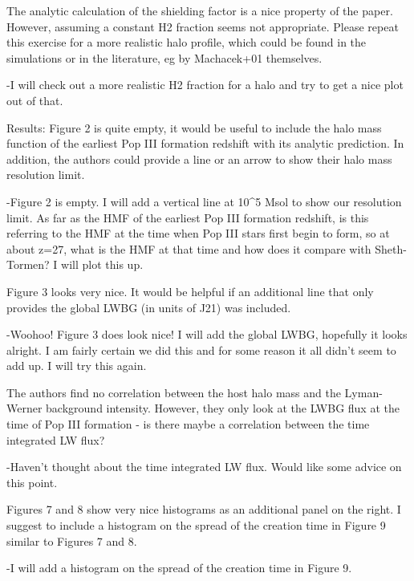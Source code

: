 \documentclass[11pt]{article}
\begin{document}
\begin{referee}
The analytic calculation of the shielding factor is a nice property of the paper. However, assuming a constant H2 fraction seems not appropriate. Please repeat this exercise for a more realistic halo profile, which could be found in the simulations or in the literature, eg by Machacek+01 themselves.
\end{referee}
-I will check out a more realistic H2 fraction for a halo and try to get a nice plot out of that.

\begin{referee}
Results:
Figure 2 is quite empty, it would be useful to include the halo mass function of the earliest Pop III formation redshift with its analytic prediction. In addition, the authors could provide a line or an arrow to show their halo mass resolution limit.
\end{referee}
-Figure 2 is empty. I will add a vertical line at 10^5 Msol to show our resolution limit. As far as the HMF of the earliest Pop III formation redshift, is this referring to the HMF at the time when Pop III stars first begin to form, so at about z=27, what is the HMF at that time and how does it compare with Sheth-Tormen? I will plot this up.

\begin{referee}
Figure 3 looks very nice. It would be helpful if an additional line that only provides the global LWBG (in units of J21) was included.
\end{referee}
-Woohoo! Figure 3 does look nice! I will add the global LWBG, hopefully it looks alright. I am fairly certain we did this and for some reason it all didn't seem to add up. I will try this again.

\begin{referee}
The authors find no correlation between the host halo mass and the Lyman-Werner background intensity. However, they only look at the LWBG flux at the time of Pop III formation - is there maybe a correlation between the time integrated LW flux?
\end{referee}
-Haven't thought about the time integrated LW flux. Would like some advice on this point. 

\begin{referee}
Figures 7 and 8 show very nice histograms as an additional panel on the right. I suggest to include a histogram on the spread of the creation time in Figure 9 similar to Figures 7 and 8.
\end{referee}
-I will add a histogram on the spread of the creation time in Figure 9.
\end{document}
